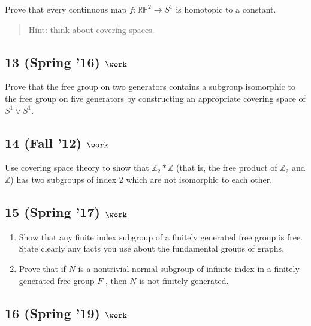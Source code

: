 Prove that every continuous map \(f : {\mathbb{RP}}^2 \to S^1\) is
homotopic to a constant.

\begin{quote}
Hint: think about covering spaces.
\end{quote}

\hypertarget{spring-16-work-1}{%
\subsection{\texorpdfstring{13 (Spring '16)
\(\work\)}{13 (Spring '16) \textbackslash work}}\label{spring-16-work-1}}

Prove that the free group on two generators contains a subgroup
isomorphic to the free group on five generators by constructing an
appropriate covering space of \(S^1 \lor S^1\).

\hypertarget{fall-12-work-1}{%
\subsection{\texorpdfstring{14 (Fall '12)
\(\work\)}{14 (Fall '12) \textbackslash work}}\label{fall-12-work-1}}

Use covering space theory to show that
\({\mathbb{Z}}_2 \ast {\mathbb{Z}}\) (that is, the free product of
\({\mathbb{Z}}_2\) and \({\mathbb{Z}}\)) has two subgroups of index 2
which are not isomorphic to each other.

\hypertarget{spring-17-work}{%
\subsection{\texorpdfstring{15 (Spring '17)
\(\work\)}{15 (Spring '17) \textbackslash work}}\label{spring-17-work}}

\begin{enumerate}
\def\labelenumi{\alph{enumi}.}
\item
  Show that any finite index subgroup of a finitely generated free group
  is free. State clearly any facts you use about the fundamental groups
  of graphs.
\item
  Prove that if \(N\) is a nontrivial normal subgroup of infinite index
  in a finitely generated free group \(F\) , then \(N\) is not finitely
  generated.
\end{enumerate}

\hypertarget{spring-19-work}{%
\subsection{\texorpdfstring{16 (Spring '19)
\(\work\)}{16 (Spring '19) \textbackslash work}}\label{spring-19-work}}

